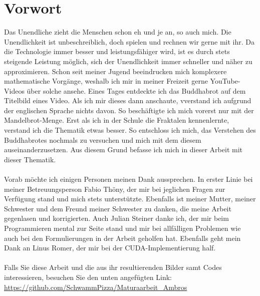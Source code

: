 \section*{Vorwort}
Das Unendliche zieht die Menschen schon eh und je an, so auch mich. Die Unendlichkeit ist unbeschreiblich, doch spielen und rechnen wir gerne mit ihr. Da die Technologie immer besser und leistungsfähiger wird, ist es durch stets steigende Leistung möglich, sich der Unendlichkeit immer schneller und näher zu approximieren. Schon seit meiner Jugend beeindrucken mich komplexere mathematische Vorgänge, weshalb ich mir in meiner Freizeit gerne YouTube-Videos über solche ansehe. Eines Tages entdeckte ich das Buddhabrot auf dem Titelbild eines Video. Als ich mir dieses dann anschaute, vverstand ich aufgrund der englischen Sprache nichts davon. So beschäftigte ich mich vorerst nur mit der Mandelbrot-Menge. Erst als ich in der Schule die Fraktalen kennenlernte, verstand ich die Thematik etwas besser. So entschloss ich mich, das Verstehen des Buddhabrotes nochmals zu versuchen und mich mit dem diesem auseinanderzusetzen. Aus diesem Grund befasse ich mich in dieser Arbeit mit dieser Thematik.\\
\\
Vorab möchte ich einigen Personen meinen Dank aussprechen. In erster Linie bei meiner Betreuungsperson Fabio Thöny, der mir bei jeglichen Fragen zur Verfügung stand und mich stets unterstützte. Ebenfalls ist meiner Mutter, meiner Schwester und dem Freund meiner Schwester zu danken, die meine Arbeit gegenlasen und korrigierten. Auch Julian Steiner danke ich, der mir beim Programmieren mental zur Seite stand und mir bei allfälligen Problemen wie auch bei den Formulierungen in der Arbeit geholfen hat. Ebenfalls geht mein Dank an Linus Romer, der mir bei der CUDA-Implementierung half.\\
\\
Falls Sie diese Arbeit und die aus ihr resultierenden Bilder samt Codes interessieren, besuchen Sie den unten angefügten Link:\\ 
\url{https://github.com/SchwammPizza/Maturaarbeit_Ambros}